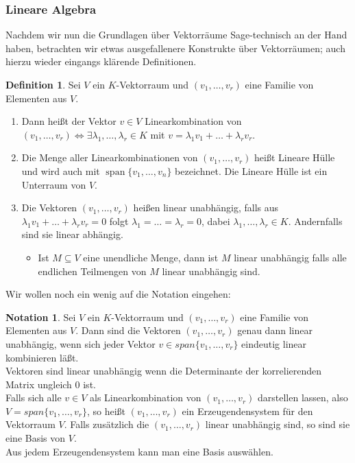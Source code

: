 \documentclass[fontsize=12pt,paper=a4,twoside,bibtotoc,idxtotoc,
liststotoc,pagesize,BCOR1.2cm,DIV15,chapterprefix,pagesize=pdftex]{scrbook}
\theoremstyle{plain}
\theoremstyle{definition}
\newtheorem{df}[equation]{Definition}
\newtheorem{nt}[equation]{Notation}
\theoremstyle{remark}
\begin{document}
\subsubsection{Lineare Algebra}
Nachdem wir nun die Grundlagen über Vektorräume Sage-technisch an der Hand haben, betrachten wir etwas ausgefallenere Konstrukte über Vektorräumen; auch hierzu wieder 
eingangs klärende Definitionen.
\begin{df}
Sei $V$ ein $K$-Vektorraum und $(v_1,\dots ,v_r)$ eine Familie von
Elementen aus $V$.
\begin{enumerate}
 \item Dann heißt der Vektor $v \in V$ Linearkombination von $(v_1,\dots ,v_r)\Leftrightarrow\exists \lambda_1, \dots, \lambda_r \in K$ mit 
 $v= \lambda_1 v_1 + \dots + \lambda_r v_r$.
\item Die Menge aller Linearkombinationen von $(v_1,\dots ,v_r)$ heißt Lineare Hülle und wird auch mit $\mathop{span}\{v_1, \dots, v_n\}$ bezeichnet.
Die Lineare Hülle ist ein Unterraum von $V$.
\item Die Vektoren $(v_1,\dots ,v_r)$ heißen linear unabhängig, falls aus $\lambda_1 v_1 + \dots + \lambda_r v_r=0$ folgt $\lambda_1= \dots =
  \lambda_r=0$, dabei $\lambda_1, \dots , \lambda_r \in K$. Andernfalls sind sie linear abhängig.
  \begin{itemize}
   \item Ist $M \subseteq V$ eine unendliche Menge, dann ist $M$ linear unabhängig falls alle endlichen Teilmengen von $M$ linear unabhängig sind.
  \end{itemize}
\end{enumerate}
\end{df}
Wir wollen noch ein wenig auf die Notation eingehen:
\begin{nt}
Sei $V$ ein $K$-Vektorraum und $(v_1,\dots ,v_r)$ eine Familie von
Elementen aus $V$. Dann sind die Vektoren $(v_1,\dots ,v_r)$ genau dann linear unabhängig, wenn sich
jeder Vektor $v \in span\{v_1, \dots ,v_r\}$ eindeutig linear kombinieren läßt.\\ 
Vektoren sind linear unabhängig wenn die Determinante der korrelierenden Matrix ungleich 0 ist.\\
Falls sich alle $v\in V$ als Linearkombination von $(v_1,\dots ,v_r)$ darstellen lassen, also $V=span\{v_1,\dots ,v_r \}$, so heißt 
$(v_1,\dots ,v_r)$ ein Erzeugendensystem für den Vektorraum $V$. Falls zusätzlich die $(v_1,\dots ,v_r)$ linear unabhängig sind, so 
sind sie eine Basis von $V$.\\
Aus jedem Erzeugendensystem kann man eine Basis auswählen.
\end{nt}
\end{document}
